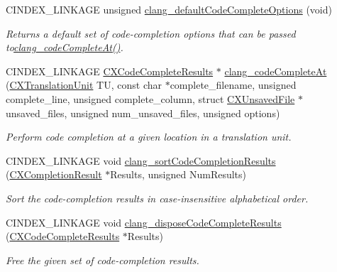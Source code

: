 \begin{DoxyCompactItemize}
C\+I\+N\+D\+E\+X\+\_\+\+L\+I\+N\+K\+A\+GE unsigned \mbox{\hyperlink{group__CINDEX__CODE__COMPLET_gadb669685b9ef1f8ca62b2a044b846ac1}{clang\+\_\+default\+Code\+Complete\+Options}} (void)
\begin{DoxyCompactList}\small\item\em Returns a default set of code-\/completion options that can be passed to{\ttfamily \mbox{\hyperlink{group__CINDEX__CODE__COMPLET_ga50fedfa85d8d1517363952f2e10aa3bf}{clang\+\_\+code\+Complete\+At()}}}. \end{DoxyCompactList}\item 
C\+I\+N\+D\+E\+X\+\_\+\+L\+I\+N\+K\+A\+GE \mbox{\hyperlink{structCXCodeCompleteResults}{C\+X\+Code\+Complete\+Results}} $\ast$ \mbox{\hyperlink{group__CINDEX__CODE__COMPLET_ga50fedfa85d8d1517363952f2e10aa3bf}{clang\+\_\+code\+Complete\+At}} (\mbox{\hyperlink{group__CINDEX_gacdb7815736ca709ce9a5e1ec2b7e16ac}{C\+X\+Translation\+Unit}} TU, const char $\ast$complete\+\_\+filename, unsigned complete\+\_\+line, unsigned complete\+\_\+column, struct \mbox{\hyperlink{structCXUnsavedFile}{C\+X\+Unsaved\+File}} $\ast$unsaved\+\_\+files, unsigned num\+\_\+unsaved\+\_\+files, unsigned options)
\begin{DoxyCompactList}\small\item\em Perform code completion at a given location in a translation unit. \end{DoxyCompactList}\item 
C\+I\+N\+D\+E\+X\+\_\+\+L\+I\+N\+K\+A\+GE void \mbox{\hyperlink{group__CINDEX__CODE__COMPLET_gaf2625ffd90004cf3202c7f9112eb3fe7}{clang\+\_\+sort\+Code\+Completion\+Results}} (\mbox{\hyperlink{structCXCompletionResult}{C\+X\+Completion\+Result}} $\ast$Results, unsigned Num\+Results)
\begin{DoxyCompactList}\small\item\em Sort the code-\/completion results in case-\/insensitive alphabetical order. \end{DoxyCompactList}\item 
\mbox{\label{group__CINDEX__CODE__COMPLET_ga206cc6ea7be311537bb0fab584ebc6c1}} 
C\+I\+N\+D\+E\+X\+\_\+\+L\+I\+N\+K\+A\+GE void \mbox{\hyperlink{group__CINDEX__CODE__COMPLET_ga206cc6ea7be311537bb0fab584ebc6c1}{clang\+\_\+dispose\+Code\+Complete\+Results}} (\mbox{\hyperlink{structCXCodeCompleteResults}{C\+X\+Code\+Complete\+Results}} $\ast$Results)
\begin{DoxyCompactList}\small\item\em Free the given set of code-\/completion results. \end{DoxyCompactList}\item 

\end{DoxyCompactItemize}
